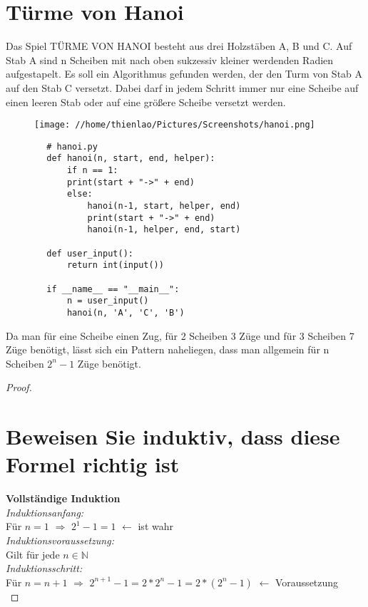 \documentclass{article}
\begin{document}
	
	\section*{Türme von Hanoi}

	\textmd{
	Das Spiel TÜRME VON HANOI besteht aus drei Holzstäben A, B und C. Auf Stab A sind n Scheiben
	mit nach oben sukzessiv kleiner werdenden Radien aufgestapelt. Es soll ein Algorithmus gefunden
	werden, der den Turm von Stab A auf den Stab C versetzt. Dabei darf in jedem Schritt immer nur
	eine Scheibe auf einen leeren Stab oder auf eine größere Scheibe versetzt werden.
	} 
	
	\begin{figure} [h]
		\centering
		\texttt{[image: //home/thienlao/Pictures/Screenshots/hanoi.png]}
	\end{figure}
	\vspace{-20pt}
	\begin{lstlisting}
		# hanoi.py
		def hanoi(n, start, end, helper): 
			if n == 1:
			print(start + "->" + end)  
			else:
				hanoi(n-1, start, helper, end)
				print(start + "->" + end)
				hanoi(n-1, helper, end, start)
		
		def user_input():
			return int(input())
		
		if __name__ == "__main__": 
			n = user_input()
			hanoi(n, 'A', 'C', 'B') 
	\end{lstlisting}
	
	\textmd{ 
	Da man für eine Scheibe einen Zug, für 2 Scheiben 3 Züge und für 3 Scheiben 7 Züge benötigt, 
	lässt sich ein Pattern naheliegen, dass man allgemein für n Scheiben $2^n - 1$ Züge benötigt. 
	} 
	
	\begin{proof}
		\section*{\small Beweisen Sie induktiv, dass diese Formel richtig ist} 
		\vspace{-2mm}
		\textbf{Vollständige Induktion} \\
		[1mm]
		\textit{Induktionsanfang:} \\
		[1mm]
		Für \( n = 1 \) $\Rightarrow$  \( 2^1 - 1 = 1 \) $\longleftarrow$ ist wahr \\
		[1mm]
		\textit{Induktionsvoraussetzung:} \\
		[1mm]
		Gilt für jede \( n \in \mathbb{N} \) \\
		[1mm]
		\textit{Induktionsschritt:} \\
		[1mm]
		Für \( n = n + 1 \) $\Rightarrow$ \( 2^{n + 1} - 1 = 2 * 2^n - 1 = 2*(2^n - 1) \) $\longleftarrow$ Voraussetzung \\
	\end{proof}
	
\end{document}
